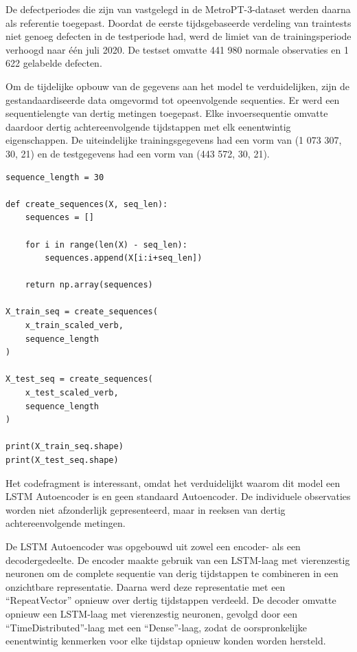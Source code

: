 {{{{De defectperiodes die zijn van vastgelegd in de MetroPT-3-dataset werden daarna als referentie toegepast. Doordat de eerste tijdsgebaseerde verdeling van traintests niet genoeg defecten in de testperiode had, werd de limiet van de trainingsperiode verhoogd naar één juli 2020. De testset omvatte 441 980 normale observaties en 1 622 gelabelde defecten.

Om de tijdelijke opbouw van de gegevens aan het model te verduidelijken, zijn de gestandaardiseerde data omgevormd tot opeenvolgende sequenties. Er werd een sequentielengte van dertig metingen toegepast. Elke invoersequentie omvatte daardoor dertig achtereenvolgende tijdstappen met elk eenentwintig eigenschappen. De uiteindelijke trainingsgegevens had een vorm van (1 073 307, 30, 21) en de testgegevens had een vorm van (443 572, 30, 21).

\begin{listing}[H]
\begin{verbatim}
sequence_length = 30

def create_sequences(X, seq_len):
    sequences = []

    for i in range(len(X) - seq_len):
        sequences.append(X[i:i+seq_len])

    return np.array(sequences)

X_train_seq = create_sequences(
    x_train_scaled_verb,
    sequence_length
)

X_test_seq = create_sequences(
    x_test_scaled_verb,
    sequence_length
)

print(X_train_seq.shape)
print(X_test_seq.shape)
\end{verbatim}
\caption[Code snippet: opstellen van de tijdsequenties in de MetroPT-3-dataset]{Codefragment van het opstellen van de tijdsequenties in de MetroPT-3-dataset.}
\end{listing}

Het codefragment is interessant, omdat het verduidelijkt waarom dit model een LSTM Autoencoder is en geen standaard Autoencoder. De individuele observaties worden niet afzonderlijk gepresenteerd, maar in reeksen van dertig achtereenvolgende metingen.

De LSTM Autoencoder was opgebouwd uit zowel een encoder- als een decodergedeelte. De encoder maakte gebruik van een LSTM-laag met vierenzestig neuronen om de complete sequentie van derig tijdstappen te combineren in een onzichtbare representatie. Daarna werd deze representatie met een ``RepeatVector'' opnieuw over dertig tijdstappen verdeeld. De decoder omvatte opnieuw een LSTM-laag met vierenzestig neuronen, gevolgd door een ``TimeDistributed''-laag met een ``Dense''-laag, zodat de oorspronkelijke eenentwintig kenmerken voor elke tijdstap opnieuw konden worden hersteld.

}}}}
